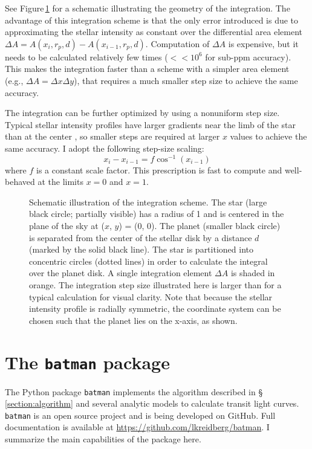 \documentclass[12pt,preprint]{aastex}
\newcommand*{\blue}{\textcolor{blue}}
\begin{document}
See Figure\,\ref{fig:integration} for a schematic illustrating the geometry of the integration.  The advantage of this integration scheme is that the only error introduced is due to approximating the stellar intensity as constant over the differential area element $\Delta A = A(x_i, r_p, d) - A(x_{i-1}, r_p, d)$.  Computation of $\Delta A$ is expensive, but it needs to be calculated relatively few times ($<<10^{6}$ for sub-ppm accuracy). This makes the integration faster than a scheme with a simpler area element (e.g., $\Delta A = \Delta x \Delta y$), that requires a much smaller step size to achieve the same accuracy.

The integration can be further optimized by using a nonuniform step size.  Typical stellar intensity profiles have larger gradients near the limb of the star than at the center \citep[e.g.][]{claret00}, so smaller steps are required at larger $x$ values to achieve the same accuracy.  I adopt the following step-size scaling: 
$$
x_i - x_{i-1}  = f\cos^{-1}\left(x_{i-1}\right)
$$  
where $f$ is a constant scale factor. This prescription is fast to compute and well-behaved at the limits $x=0$ and $x=1$.


\begin{figure}
\caption{Schematic illustration of the integration scheme. The star (large black circle; partially visible) has a radius of 1 and is centered in the plane of the sky at ($x$, $y$) = (0, 0). The planet (smaller black circle) is separated from the center of the stellar disk by a distance $d$ (marked by the solid black line).  The star is partitioned into concentric circles (dotted lines) in order to calculate the integral over the planet disk.  A single integration element $\Delta A$ is shaded in orange. The integration step size illustrated here is larger than for a typical calculation for visual clarity.  Note that because the stellar intensity profile is radially symmetric, the coordinate system can be chosen such that the planet lies on the x-axis, as shown.}
\label{fig:integration}
\end{figure}

\section{The \texttt{batman} package}
\label{section:batman}
The Python package \texttt{batman} implements the algorithm described in \S\,\ref{section:algorithm} and several analytic models to calculate transit light curves.  \texttt{batman} is an open source project and is being developed on GitHub.  Full documentation is available at \blue{\url{https://github.com/lkreidberg/batman}}. I summarize the main capabilities of the package here.
\end{document}
